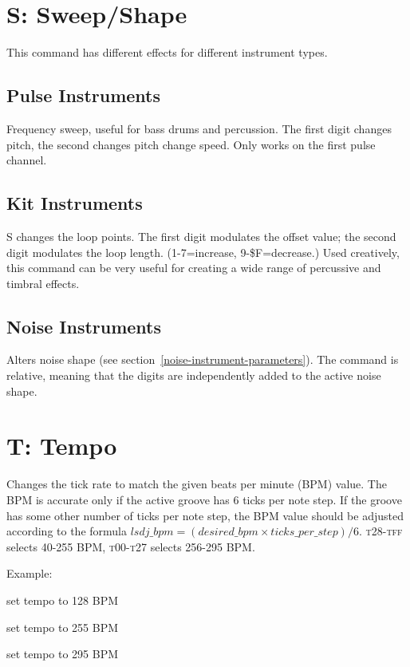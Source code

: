\section{S: Sweep/Shape}

This command has different effects for different instrument types.

\subsection{Pulse Instruments}

Frequency sweep, useful for bass drums and percussion. The first digit changes pitch, the second changes pitch change speed. Only works on the first pulse channel.

\subsection{Kit Instruments}

S changes the loop points. The first digit modulates the offset value; the second digit modulates the loop length. (1-7=increase, 9-\$F=decrease.) Used creatively, this command can be very useful for creating a wide range of percussive and timbral effects.

\subsection{Noise Instruments}

Alters noise shape (see section~\ref{noise-instrument-parameters}).
The command is relative, meaning that the digits are independently added to the active noise shape.

\section{T: Tempo}

Changes the tick rate to match the given beats per minute (BPM) value. The BPM is accurate only if the active groove has 6 ticks per note step. If the groove has some other number of ticks per note step, the BPM value should be adjusted according to the formula
\begin{math}
lsdj\_bpm = (desired\_bpm \times ticks\_per\_step)/{6}
\end{math}.
\textsc{t28}-\textsc{tff} selects 40-255 BPM, \textsc{t00}-\textsc{t27} selects 256-295 BPM.

\begin{description}
\item Example:
\item[T80] set tempo to 128 BPM
\item[TFF] set tempo to 255 BPM
\item[T27] set tempo to 295 BPM
\end{description}

